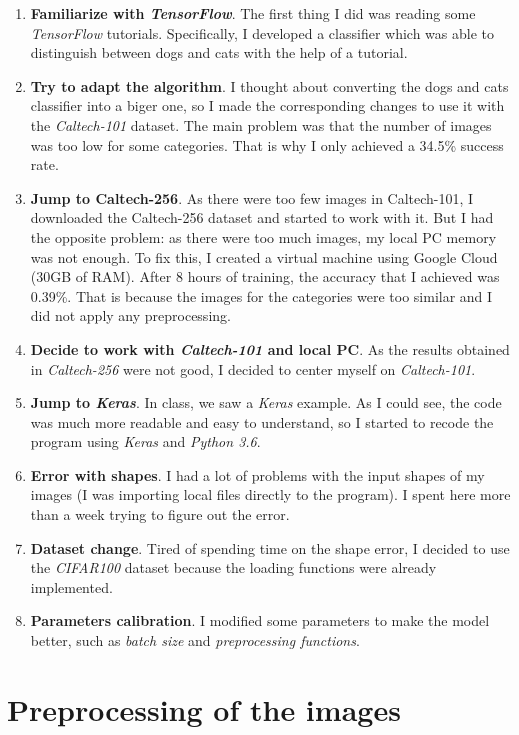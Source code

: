 \documentclass[12pt,english]{article}
\begin{document}
\begin{enumerate}
	\item \textbf{Familiarize with \emph{TensorFlow}}. The first thing I did was reading some \emph{TensorFlow} tutorials. Specifically, I developed a classifier which was able to distinguish between dogs and cats with the help of a tutorial.
	\item \textbf{Try to adapt the algorithm}. I thought about converting the dogs and cats classifier into a biger one, so I made the corresponding changes to use it with the \emph{Caltech-101} dataset. The main problem was that the number of images was too low for some categories. That is why I only achieved a 34.5\% success rate.
	\item \textbf{Jump to Caltech-256}. As there were too few images in Caltech-101, I downloaded the Caltech-256 dataset and started to work with it. But I had the opposite problem: as there were too much images, my local PC memory was not enough. To fix this, I created a virtual machine using Google Cloud (30GB of RAM). After 8 hours of training, the accuracy that I achieved was  0.39\%. That is because the images for the categories were too similar and I did not apply any preprocessing.
	\item \textbf{Decide to work with \emph{Caltech-101} and local PC}. As the results obtained in \emph{Caltech-256} were not good, I decided to center myself on \emph{Caltech-101}.
	\item \textbf{Jump to \emph{Keras}}. In class, we saw a \emph{Keras} example. As I could see, the code was much more readable and easy to understand, so I started to recode the program using \emph{Keras} and \emph{Python 3.6}.
	\item \textbf{Error with shapes}. I had a lot of problems with the input shapes of my images (I was importing local files directly to the program). I spent here more than a week trying to figure out the error.
	\item \textbf{Dataset change}. Tired of spending time on the shape error, I decided to use the \emph{CIFAR100} dataset because the loading functions were already implemented.
	\item \textbf{Parameters calibration}. I modified some parameters to make the model better, such as \emph{batch size} and \emph{preprocessing functions}.
\end{enumerate}

\section{Preprocessing of the images}
\end{document}
